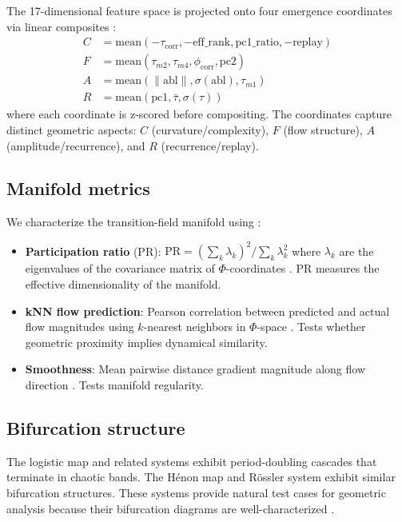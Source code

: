 \documentclass[aip,chaos,showpacs,superscriptaddress,groupedaddress]{revtex4-1}
\begin{document}
The 17-dimensional feature space is projected onto four emergence coordinates via linear composites \cite{tononi2004information, tononi2008consciousness}:
\begin{align}
C &= \text{mean}(-\tau_{\text{corr}}, -\text{eff\_rank}, \text{pc1\_ratio}, -\text{replay}) \\
F &= \text{mean}(\tau_{m2}, \tau_{m4}, \phi_{\text{corr}}, \text{pc2}) \\
A &= \text{mean}(\|\text{abl}\|, \sigma(\text{abl}), \tau_{m1}) \\
R &= \text{mean}(\text{pc1}, \bar{\tau}, \sigma(\tau))
\end{align}
where each coordinate is z-scored before compositing. The coordinates capture distinct geometric aspects: $C$ (curvature/complexity), $F$ (flow structure), $A$ (amplitude/recurrence), and $R$ (recurrence/replay).

\subsection{Manifold metrics}
\label{sec:manifold_metrics}

We characterize the transition-field manifold using \cite{kantz1997nonlinear, schreiber1999interdisciplinary}:
\begin{itemize}
\item \textbf{Participation ratio} (PR): $\text{PR} = (\sum_k \lambda_k)^2 / \sum_k \lambda_k^2$ where $\lambda_k$ are the eigenvalues of the covariance matrix of $\Phi$-coordinates \cite{roy1989effective}. PR measures the effective dimensionality of the manifold.
\item \textbf{kNN flow prediction}: Pearson correlation between predicted and actual flow magnitudes using $k$-nearest neighbors in $\Phi$-space \cite{farmer1987predicting}. Tests whether geometric proximity implies dynamical similarity.
\item \textbf{Smoothness}: Mean pairwise distance gradient magnitude along flow direction \cite{amari2016information}. Tests manifold regularity.
\end{itemize}

\subsection{Bifurcation structure}
\label{sec:bifurcation}

The logistic map \cite{feigenbaum1978quantitative} and related systems exhibit period-doubling cascades that terminate in chaotic bands. The H\'enon map \cite{henon1976two-dimensional} and R\"ossler system \cite{rossler1976equation} exhibit similar bifurcation structures. These systems provide natural test cases for geometric analysis because their bifurcation diagrams are well-characterized \cite{guckenheimer1983nonlinear, wiggins2003introduction}.
\end{document}
